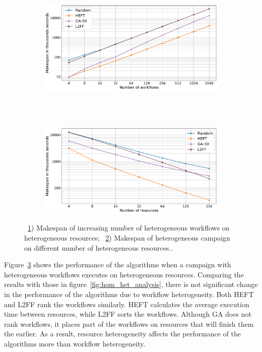 \begin{figure}[ht!]
    \centering
    \begin{subfigure}[b]{0.75\textwidth}
        \includegraphics[width=.95\textwidth]{figures/campaign/StHeteroCampaigns_4StHeteroResources.pdf}
        \caption{}
        \label{fig:StHeteroCampaigns_4StHeteroResources}
    \end{subfigure}\\
    ~ 
    \begin{subfigure}[b]{0.75\textwidth}
        \includegraphics[width=.95\textwidth]{figures/campaign/StHeteroResources_StHeteroCampaigns.pdf}
        \caption{}
        \label{fig:StHeteroResources_StHeteroCampaigns}
    \end{subfigure}
    \caption{~\ref{fig:StHeteroCampaigns_4StHeteroResources}) Makespan of increasing number of heterogeneous workflows on heterogeneous resources;
        ~\ref{fig:StHeteroResources_StHeteroCampaigns}) Makespan of heterogeneous campaign on different number of heterogeneous resources..}
    \label{fig:heter_analysis}
\end{figure}

Figure~\ref{fig:heter_analysis} shows the performance of the algorithms when a campaign with heterogeneous workflows executes on heterogeneous resources.
Comparing the results with those in figure~\ref{fig:hom_het_analysis}, there is not significant change in the performance of the algorithms due to workflow heterogeneity.
Both HEFT and L2FF rank the workflows similarly.
HEFT calculates the average execution time between resources, while L2FF sorts the workflows.
Although GA does not rank workflows, it places part of the workflows on resources that will finish them the earlier.
As a result, resource heterogeneity affects the performance of the algorithms more than workflow heterogeneity.

